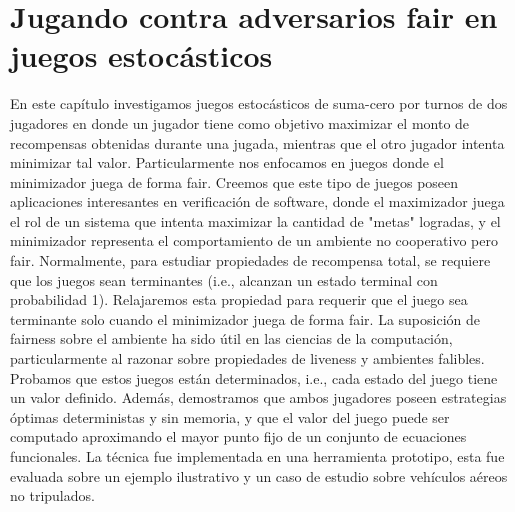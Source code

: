\chapter{Jugando contra adversarios fair en juegos estocásticos}
\label{cap:fairAdversaries}

En este capítulo investigamos juegos estocásticos de suma-cero por turnos de dos jugadores en donde un jugador tiene como objetivo maximizar el monto de recompensas obtenidas durante una jugada, mientras que el otro jugador intenta minimizar tal valor. Particularmente nos enfocamos en juegos donde el minimizador juega de forma fair. Creemos que este tipo de juegos poseen aplicaciones interesantes en verificación de software, donde el maximizador juega el rol de un sistema que intenta maximizar la cantidad de "metas" logradas, y el minimizador representa el comportamiento de un ambiente no cooperativo pero fair.
Normalmente, para estudiar propiedades de recompensa total, se requiere que los juegos sean terminantes (i.e., alcanzan un estado terminal con probabilidad 1). 
Relajaremos esta propiedad para requerir que el juego sea terminante solo cuando el minimizador juega de forma fair. La suposición de fairness sobre el ambiente ha sido útil en las ciencias de la computación, particularmente al razonar sobre propiedades de liveness y ambientes falibles.
Probamos que estos juegos están determinados, i.e., cada estado del juego tiene un valor definido. Además, demostramos que ambos jugadores poseen estrategias óptimas deterministas y sin memoria, y que el valor del juego puede ser computado aproximando el mayor punto fijo de un conjunto de ecuaciones funcionales. La técnica fue implementada en una herramienta prototipo, esta fue evaluada sobre un ejemplo ilustrativo y un caso de estudio sobre vehículos aéreos no tripulados.







